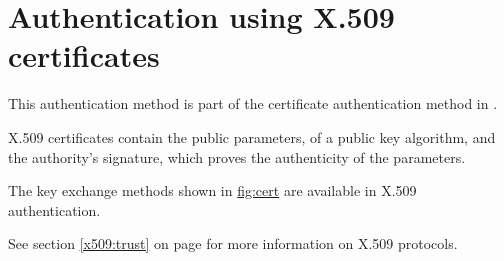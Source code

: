 \section{Authentication using X.509 certificates}

This authentication method is part of the certificate authentication
method in \gnutls{}.
\par
X.509 certificates contain the public parameters, 
of a public key algorithm, and the authority's signature, which proves the
authenticity of the parameters.
\par
The key exchange methods shown in \hyperref{figure}{figure }{}{fig:cert} are
available in X.509 authentication. 

See section \ref{x509:trust} on page \pageref{x509:trust} for more information
on X.509 protocols.
